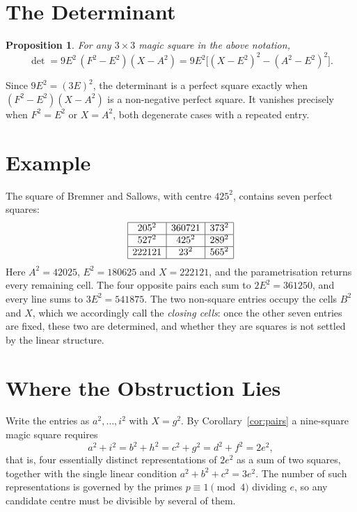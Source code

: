 \documentclass[12pt]{article}
\newtheorem{proposition}[theorem]{Proposition}
\theoremstyle{remark}
\begin{document}
\section{The Determinant}

\begin{proposition}
For any $3\times3$ magic square in the above notation,
\[
\det = 9E^2\,(F^2 - E^2)(X - A^2)
     = 9E^2\bigl[(X - E^2)^2 - (A^2 - E^2)^2\bigr].
\]
\end{proposition}

Since $9E^2 = (3E)^2$, the determinant is a perfect square exactly when
$(F^2 - E^2)(X - A^2)$ is a non-negative perfect square. It vanishes
precisely when $F^2 = E^2$ or $X = A^2$, both degenerate cases with a
repeated entry.

\section{Example}\label{sec:ex}

The square of Bremner and Sallows, with centre $425^2$, contains seven
perfect squares:
\[
\begin{array}{|c|c|c|}
\hline
205^2 & 360721 & 373^2 \\ \hline
527^2 & 425^2  & 289^2 \\ \hline
222121 & 23^2  & 565^2 \\ \hline
\end{array}
\]
Here $A^2 = 42025$, $E^2 = 180625$ and $X = 222121$, and the
parametrisation returns every remaining cell. The four opposite pairs
each sum to $2E^2 = 361250$, and every line sums to $3E^2 = 541875$.
The two non-square entries occupy the cells $B^2$ and $X$, which we
accordingly call the \emph{closing cells}: once the other seven entries
are fixed, these two are determined, and whether they are squares is
not settled by the linear structure.

\section{Where the Obstruction Lies}

Write the entries as $a^2, \dots, i^2$ with $X = g^2$. By
Corollary~\ref{cor:pairs} a nine-square magic square requires
\[
a^2 + i^2 = b^2 + h^2 = c^2 + g^2 = d^2 + f^2 = 2e^2,
\]
that is, four essentially distinct representations of $2e^2$ as a sum
of two squares, together with the single linear condition
$a^2 + b^2 + c^2 = 3e^2$. The number of such representations is
governed by the primes $p \equiv 1 \pmod 4$ dividing $e$, so any
candidate centre must be divisible by several of them.
\end{document}
